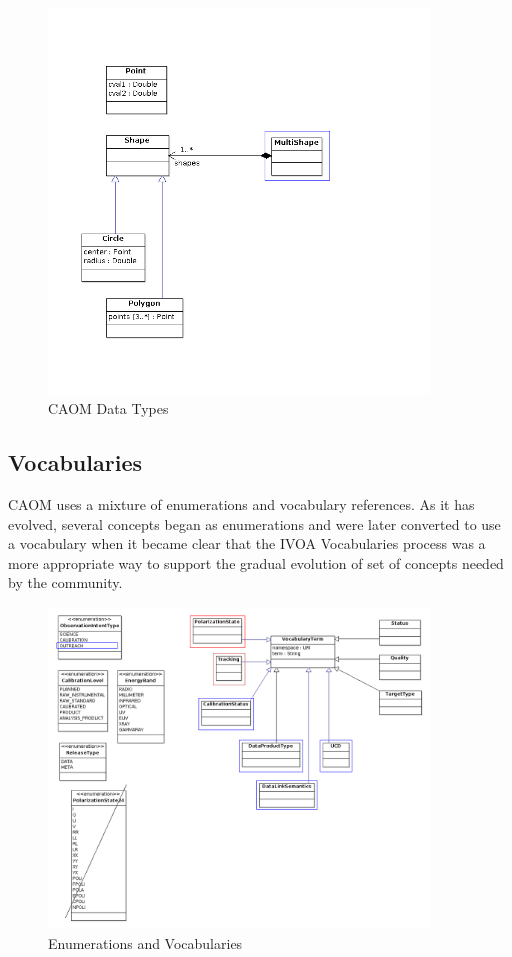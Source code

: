 \documentclass[11pt,a4paper]{ivoa}
\begin{document}
\begin{figure}
\centering
\includegraphics[width=0.9\textwidth]{src/uml/CAOM2datatypes.png}
\caption{CAOM Data Types}
\label{fig:datatypes}
\end{figure}

\subsection{Vocabularies}

CAOM uses a mixture of enumerations and vocabulary references. As it has evolved,
several concepts began as enumerations and were later converted to use a vocabulary
when it became clear that the IVOA Vocabularies process was a more appropriate way
to support the gradual evolution of set of concepts needed by the community.

\begin{figure}
\centering
\includegraphics[width=0.9\textwidth]{src/uml/CAOM3vocabularies.png}
\caption{Enumerations and Vocabularies}
\label{fig:vocab}
\end{figure}
\end{document}
